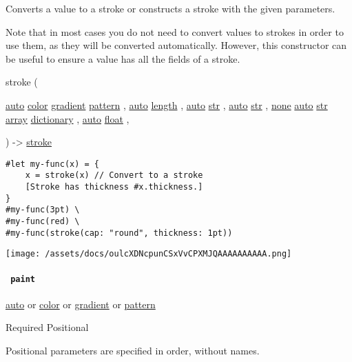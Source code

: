 Converts a value to a stroke or constructs a stroke with the given
parameters.

Note that in most cases you do not need to convert values to strokes in
order to use them, as they will be converted automatically. However,
this constructor can be useful to ensure a value has all the fields of a
stroke.

{ stroke } (

{ \href{/docs/reference/foundations/auto/}{auto}
\href{/docs/reference/visualize/color/}{color}
\href{/docs/reference/visualize/gradient/}{gradient}
\href{/docs/reference/visualize/pattern/}{pattern} , } {
\href{/docs/reference/foundations/auto/}{auto}
\href{/docs/reference/layout/length/}{length} , } {
\href{/docs/reference/foundations/auto/}{auto}
\href{/docs/reference/foundations/str/}{str} , } {
\href{/docs/reference/foundations/auto/}{auto}
\href{/docs/reference/foundations/str/}{str} , } {
\href{/docs/reference/foundations/none/}{none}
\href{/docs/reference/foundations/auto/}{auto}
\href{/docs/reference/foundations/str/}{str}
\href{/docs/reference/foundations/array/}{array}
\href{/docs/reference/foundations/dictionary/}{dictionary} , } {
\href{/docs/reference/foundations/auto/}{auto}
\href{/docs/reference/foundations/float/}{float} , }

) -\textgreater{} \href{/docs/reference/visualize/stroke/}{stroke}

\begin{verbatim}
#let my-func(x) = {
    x = stroke(x) // Convert to a stroke
    [Stroke has thickness #x.thickness.]
}
#my-func(3pt) \
#my-func(red) \
#my-func(stroke(cap: "round", thickness: 1pt))
\end{verbatim}

\texttt{[image: /assets/docs/oulcXDNcpunCSxVvCPXMJQAAAAAAAAAA.png]}

\paragraph{\texorpdfstring{\texttt{\ paint\ }}{ paint }}\label{constructor-paint}

\href{/docs/reference/foundations/auto/}{auto} {or}
\href{/docs/reference/visualize/color/}{color} {or}
\href{/docs/reference/visualize/gradient/}{gradient} {or}
\href{/docs/reference/visualize/pattern/}{pattern}

{Required} {{ Positional }}

\label{constructor-paint-positional-tooltip}
Positional parameters are specified in order, without names.

